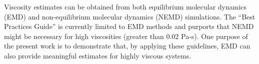 \documentclass[preprint,review,12pt]{elsarticle}
\begin{document}
	
	Viscosity estimates can be obtained from both equilibrium molecular dynamics (EMD) and non-equilibrium molecular dynamics (NEMD) simulations. The ``Best Practices Guide'' is currently limited to EMD methods and purports that NEMD might be necessary for high viscosities (greater than 0.02 Pa-s). One purpose of the present work is to demonstrate that, by applying these guidelines, EMD can also provide meaningful estimates for highly viscous systems. 
	
	
%	
	
	
	
\end{document}
